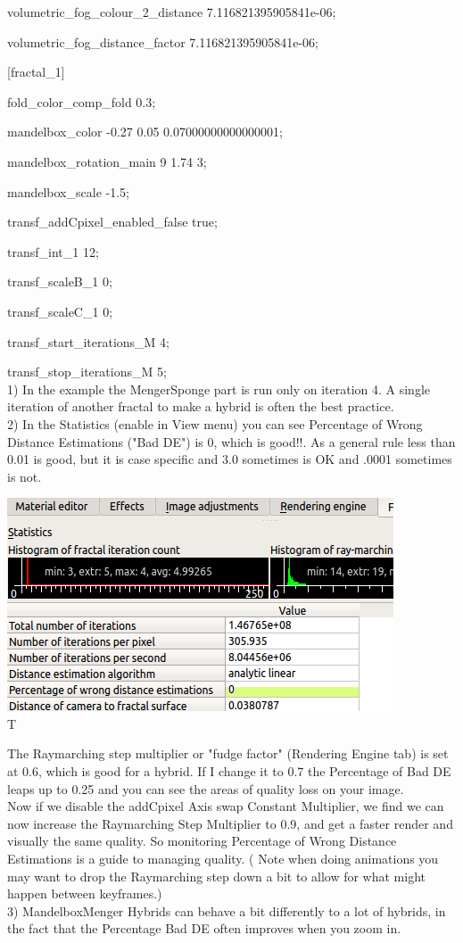volumetric\_fog\_colour\_2\_distance 7.116821395905841e-06;

volumetric\_fog\_distance\_factor 7.116821395905841e-06;

{[}fractal\_1{]}

fold\_color\_comp\_fold 0.3;

mandelbox\_color -0.27 0.05 0.07000000000000001;

mandelbox\_rotation\_main 9 1.74 3;

mandelbox\_scale -1.5;

transf\_addCpixel\_enabled\_false true;

transf\_int\_1 12;

transf\_scaleB\_1 0;

transf\_scaleC\_1 0;

transf\_start\_iterations\_M 4;

transf\_stop\_iterations\_M 5;\\[2\baselineskip]1) In the example the
MengerSponge part is run only on iteration 4. A single iteration of
another fractal to make a hybrid is often the best
practice.\\[2\baselineskip]2) In the Statistics (enable in View menu)
you can see Percentage of Wrong Distance Estimations ("Bad DE") is 0,
which is good!!. As a general rule less than 0.01 is good, but it is
case specific and 3.0 sometimes is OK and .0001 sometimes is not.

\includegraphics[width=4.51024in,height=2.48976in]{img/manual/media/image33.png}\\[2\baselineskip]T

The Raymarching step multiplier or "fudge factor" (Rendering Engine tab)
is set at 0.6, which is good for a hybrid. If I change it to 0.7 the
Percentage of Bad DE leaps up to 0.25 and you can see the areas of
quality loss on your image.\\[2\baselineskip]Now if we disable the
addCpixel Axis swap Constant Multiplier, we find we can now increase the
Raymarching Step Multiplier to 0.9, and get a faster render and visually
the same quality. So monitoring Percentage of Wrong Distance Estimations
is a guide to managing quality. ( Note when doing animations you may
want to drop the Raymarching step down a bit to allow for what might
happen between keyframes.)\\[2\baselineskip]3) MandelboxMenger Hybrids
can behave a bit differently to a lot of hybrids, in the fact that the
Percentage Bad DE often improves when you zoom in.

